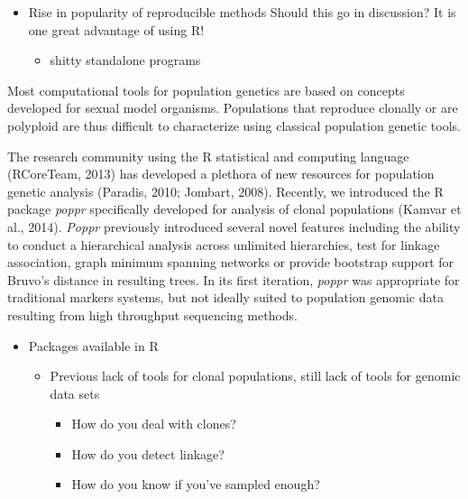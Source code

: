 \documentclass{frontiersSCNS} %
\begin{document}
\begin{itemize}
\itemsep1pt\parskip0pt
\item
  Rise in popularity of reproducible methods \textbar{} Should this go
  in discussion? It is one great advantage of using R!

  \begin{itemize}
  \itemsep1pt\parskip0pt
  \item
    shitty standalone programs
  \end{itemize}
\end{itemize}

Most computational tools for population genetics are based on concepts
developed for sexual model organisms. Populations that reproduce
clonally or are polyploid are thus difficult to characterize using
classical population genetic tools.

The research community using the R statistical and computing language
(RCoreTeam, 2013) has developed a plethora of new resources for
population genetic analysis (Paradis, 2010; Jombart, 2008). Recently, we
introduced the R package \emph{poppr} specifically developed for
analysis of clonal populations (Kamvar et al., 2014). \emph{Poppr}
previously introduced several novel features including the ability to
conduct a hierarchical analysis across unlimited hierarchies, test for
linkage association, graph minimum spanning networks or provide
bootstrap support for Bruvo's distance in resulting trees. In its first
iteration, \emph{poppr} was appropriate for traditional markers systems,
but not ideally suited to population genomic data resulting from high
throughput sequencing methods.

\begin{itemize}
\itemsep1pt\parskip0pt
\item
  Packages available in R

  \begin{itemize}
  \itemsep1pt\parskip0pt
  \item
    Previous lack of tools for clonal populations, still lack of tools
    for genomic data sets

    \begin{itemize}
    \itemsep1pt\parskip0pt
    \item
      How do you deal with clones?
    \item
      How do you detect linkage?
    \item
      How do you know if you've sampled enough?
    \end{itemize}
  \end{itemize}
\end{itemize}
\end{document}
